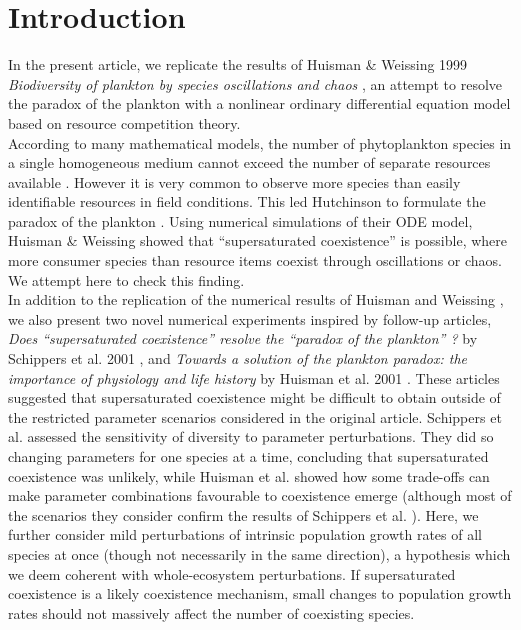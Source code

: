 \section{Introduction}
In the present article, we replicate the results of Huisman \& Weissing 1999 \textit{Biodiversity of plankton by species oscillations and chaos} \cite{1999:Huisman}, an attempt to resolve the paradox of the plankton \cite{1961:Hutchinson} with a nonlinear ordinary differential equation model based on resource competition theory.\\

According to many mathematical models, the number of phytoplankton species in a single homogeneous medium cannot exceed the number of separate resources available \cite{1960:Hardin,1973:Phillips,1980:Armstrong}. However it is very common to observe more species than easily identifiable resources in field conditions. This led Hutchinson to formulate the paradox of the plankton \cite{1961:Hutchinson}. Using numerical simulations of their ODE model, Huisman \& Weissing \cite{1999:Huisman} showed that ``supersaturated coexistence'' is possible, where more consumer species than resource items coexist through oscillations or chaos. We attempt here to check this finding. \\

In addition to the replication of the numerical results of Huisman and Weissing \cite{1999:Huisman}, we also present two novel numerical experiments inspired by follow-up articles, \textit{Does ``supersaturated coexistence'' resolve the ``paradox of the plankton'' ?} by Schippers et al. 2001 \cite{2001:Schippers}, and \textit{Towards a solution of the plankton paradox: the importance of physiology and life history} by Huisman et al. 2001 \cite{2001:Huisman}. These articles suggested that supersaturated coexistence might be difficult to obtain outside of the restricted parameter scenarios considered in the original article. Schippers et al. \cite{2008:Schippers} assessed the sensitivity of diversity to parameter perturbations. They did so changing parameters for one species at a time, concluding that supersaturated coexistence was unlikely, while Huisman et al. \cite{2008:Huisman} showed how some trade-offs can make parameter combinations favourable to coexistence emerge (although most of the scenarios they consider confirm the results of Schippers et al. \cite{2008:Schippers}). Here, we further consider mild perturbations of intrinsic population growth rates of all species at once (though not necessarily in the same direction), a hypothesis which we deem coherent with whole-ecosystem perturbations. If supersaturated coexistence is a likely coexistence mechanism, small changes to population growth rates should not massively affect the number of coexisting species. 

